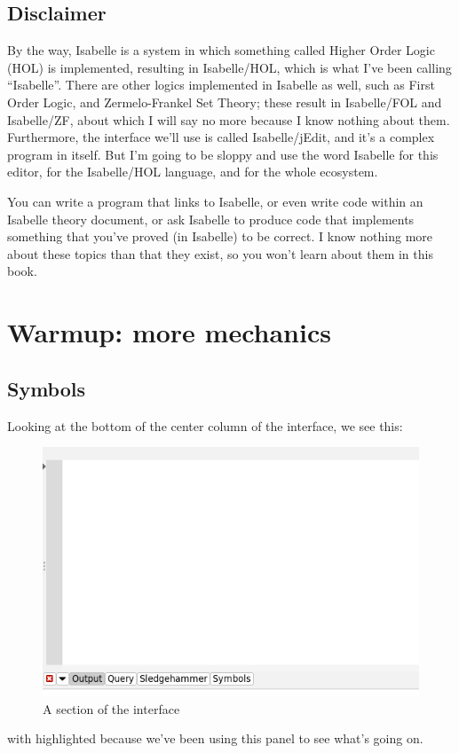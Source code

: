 \subsection*{Disclaimer}
By the way, Isabelle is a system in which something called Higher Order Logic (HOL) is implemented, resulting in Isabelle/HOL, which is what I've been calling ``Isabelle''. There are other logics implemented in Isabelle as well, such as First Order Logic, and Zermelo-Frankel Set Theory; these result in Isabelle/FOL and Isabelle/ZF, about which I will say no more because I know nothing about them. Furthermore, the interface we'll use is called Isabelle/jEdit, and it's a complex program in itself. But I'm going to be sloppy and use the word Isabelle for this editor, for the Isabelle/HOL language, and for the whole ecosystem. 

You can write a program that links to Isabelle, or even write code within an Isabelle theory document, or ask Isabelle to produce code that implements something that you've proved (in Isabelle) to be correct. I know nothing more about these topics than that they exist, so you won't learn about them in this book. 

\section{Warmup: more mechanics}
\subsection{Symbols}
Looking at the bottom of the center column of the interface, we see this:
\begin{figure} [h]
    \centering
    \includegraphics[width=0.5\linewidth]{C02//Images/image.png}
    \caption{A section of the interface}
    \label{fig:interface-section}
\end{figure}
\noindent
with  highlighted because we've been using this panel to see what's going on. 

